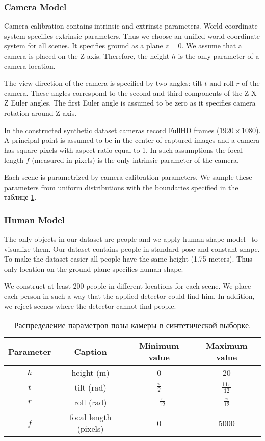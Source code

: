 \subsubsection{Camera Model}

\noindent Camera calibration contains intrinsic and extrinsic parameters. World coordinate system specifies extrinsic parameters. Thus we choose an unified world coordinate system for all scenes. It specifies ground as a plane $z = 0$. We assume that a camera is placed on the Z axis. Therefore, the height $h$ is the only parameter of a camera location.

The view direction of the camera is specified by two angles: tilt $t$ and roll $r$ of the camera. These angles correspond to the second and third components of the Z-X-Z Euler angles. The first Euler angle is assumed to be zero as it specifies camera rotation around Z axis.

In the constructed synthetic dataset cameras record FullHD frames ($1920\times1080$). A principal point is assumed to be in the center of captured images and a camera has square pixels with aspect ratio equal to 1. In such assumptions the focal length $f$ (measured in pixels) is the only intrinsic parameter of the camera.

Each scene is parametrized by camera calibration parameters. We sample these parameters from uniform distributions with the boundaries specified in the таблице \ref{tab:params}.

\subsubsection{Human Model}

\noindent The only objects in our dataset are people and we apply human shape model~\cite{pishchulin2015building} to visualize them. Our dataset contains people in standard pose and constant shape. To make the dataset easier all people have the same height (1.75 meters). Thus only location on the ground plane specifies human shape.

We construct at least 200 people in different locations for each scene. We place each person in such a way that the applied detector could find him. In addition, we reject scenes where the detector cannot find people.

\begin{table} [htbp]
	\centering
	\captionsetup{width=15cm}
	\caption{Распределение параметров позы камеры в синтетической выборке.}\label{tab:params}%
	\begin{tabular}{|c|c|c|c|}
		\hline
		Parameter & Caption & Minimum value & Maximum value\\
		\hline
		\hline
		$h$ & height (m) & 0 & 20 \\
		$t$ & tilt (rad) & $\frac{\pi}{2}$ & $\frac{11\pi}{12}$ \\
		$r$ & roll (rad) & $-\frac{\pi}{12}$ & $\frac{\pi}{12}$ \\
		$f$ & focal length (pixels) & 0 & 5000 \\
		\hline
	\end{tabular}
\end{table}


